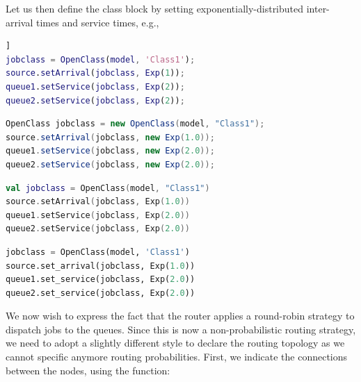 Let us then define the class block by setting exponentially-distributed inter-arrival times and service times, e.g.,
\begin{MATLAB}
\begin{lstlisting}[language = matlab, basicstyle=\ttfamily\scriptsize]]
jobclass = OpenClass(model, 'Class1');
source.setArrival(jobclass, Exp(1));
queue1.setService(jobclass, Exp(2));
queue2.setService(jobclass, Exp(2));
\end{lstlisting}
\end{MATLAB}
\begin{JAVA}
\begin{lstlisting}[language = java, basicstyle=\ttfamily\scriptsize]
OpenClass jobclass = new OpenClass(model, "Class1");
source.setArrival(jobclass, new Exp(1.0));
queue1.setService(jobclass, new Exp(2.0));
queue2.setService(jobclass, new Exp(2.0));
\end{lstlisting}
\end{JAVA}
\begin{KOTLIN}
\begin{lstlisting}[language = kotlin, basicstyle=\ttfamily\scriptsize]
val jobclass = OpenClass(model, "Class1")
source.setArrival(jobclass, Exp(1.0))
queue1.setService(jobclass, Exp(2.0))
queue2.setService(jobclass, Exp(2.0))
\end{lstlisting}
\end{KOTLIN}
\begin{PYTHON}
\begin{lstlisting}[language = python]
jobclass = OpenClass(model, 'Class1')
source.set_arrival(jobclass, Exp(1.0))
queue1.set_service(jobclass, Exp(2.0))
queue2.set_service(jobclass, Exp(2.0))
\end{lstlisting}
\end{PYTHON}
We now wish to express the fact that the router applies a round-robin strategy to dispatch jobs to the queues. Since this is now a non-probabilistic routing strategy, we need to adopt a slightly different style to declare the routing topology as we cannot specific anymore routing probabilities. First, we indicate the connections between the nodes, using the  function:
